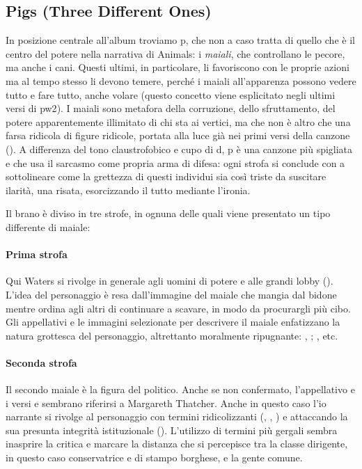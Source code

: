 \documentclass[class=book, crop=false, oneside, 12pt]{standalone}
\begin{document}
    \subsection{Pigs (Three Different Ones)}
    In posizione centrale all'album troviamo \acrfull{p}, che non a caso tratta di quello che è il centro del potere nella narrativa di Animals: i \emph{maiali}, che controllano le pecore, ma anche i cani. Questi ultimi, in particolare, li favoriscono con le proprie azioni ma al tempo stesso li devono temere, perché i maiali all'apparenza possono vedere tutto e fare tutto, anche volare (questo concetto viene esplicitato negli ultimi versi di \acrshort{pw2}). I maiali sono metafora della corruzione, dello sfruttamento, del potere apparentemente illimitato di chi sta ai vertici, ma che non è altro che una farsa ridicola di figure ridicole, portata alla luce già nei primi versi della canzone (). A differenza del tono claustrofobico e cupo di \acrshort{d}, \acrshort{p} è una canzone più spigliata e che usa il sarcasmo come propria arma di difesa: ogni strofa si conclude con  a sottolineare come la grettezza di questi individui sia così triste da suscitare ilarità, una risata, esorcizzando il tutto mediante l'ironia. 
    
    Il brano è diviso in tre strofe, in ognuna delle quali viene presentato un tipo differente di maiale:

    \paragraph{Prima strofa} Qui Waters si rivolge in generale agli uomini di potere e alle grandi lobby (). L'idea del personaggio è resa dall'immagine del maiale che mangia dal bidone mentre ordina agli altri di continuare a scavare, in modo da procurargli più cibo. Gli appellativi e le immagini selezionate per descrivere il maiale  enfatizzano la natura grottesca del personaggio, altrettanto moralmente ripugnante: , ; , etc.

    \paragraph{Seconda strofa} Il secondo maiale è la figura del politico. Anche se non confermato, l'appellativo  e i versi  e  sembrano riferirsi a Margareth Thatcher. Anche in questo caso l'io narrante si rivolge al personaggio con termini ridicolizzanti (, , ) e attaccando la sua presunta integrità istituzionale (). L'utilizzo di termini più gergali sembra inasprire la critica e marcare la distanza che si percepisce tra la classe dirigente, in questo caso conservatrice e di stampo borghese, e la gente comune.
\end{document}
